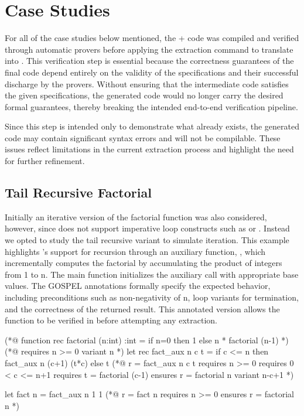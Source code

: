 \section{Case Studies}

For all of the case studies below mentioned, the \ocaml + \gospel code was compiled and verified through \whythree automatic
provers before applying the extraction command to translate into \cml. This verification step is essential because the correctness 
guarantees of the final \cml code depend entirely on the validity of the specifications and their successful discharge by the 
provers. Without ensuring that the \whyml intermediate code satisfies the given specifications, the generated \cml code would 
no longer carry the desired formal guarantees, thereby breaking the intended end-to-end verification pipeline.

Since this step is intended only to demonstrate what already exists, the generated code may contain significant syntax errors 
and will not be compilable. These issues reflect limitations in the current extraction process and highlight the need for 
further refinement.

\subsection{Tail Recursive Factorial}


Initially an iterative version of the factorial function was also considered, however, since \cml does not support imperative loop 
constructs such as  or . Instead we opted to study the tail recursive variant to simulate 
iteration.
This example highlights \ocaml's support for recursion through an auxiliary function, , which incrementally 
computes the factorial by accumulating the product of integers from 1 to n. The main function  initializes the 
auxiliary call with appropriate base values. The GOSPEL annotations formally specify the expected behavior, including 
preconditions such as non-negativity of n, loop variants for termination, and the correctness of the returned result. This 
annotated version allows the function to be verified in \whythree before attempting any extraction.

\begin{gospell}
(*@ 
  function rec factorial (n:int) :int = 
    if n=0 then 1 else n * factorial (n-1)
*)
(*@ 
  requires n >= 0
  variant n
*)
let rec fact_aux n c t =
  if c <= n then fact_aux n (c+1) (t*c) else t
(*@
  r = fact_aux n c t
  requires n >= 0
  requires 0 < c <= n+1
  requires t = factorial (c-1)
  ensures r = factorial n
  variant n-c+1
*)


let fact n = fact_aux n 1 1
(*@ 
  r = fact n
  requires n >= 0 
  ensures r = factorial n
*)
\end{gospell}

